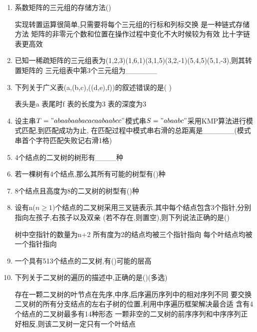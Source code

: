 \documentclass[12pt, a4paper, oneside, UTF8]{ctexbook}
\begin{document}
\begin{enumerate}
    \item 系数矩阵的三元组的存储方法()
    \begin{choices}[1]
        \task 实现转置运算很简单,只需要将每个三元组的行标和列标交换
        \task 是一种链式存储方法
        \task 矩阵的非零元个数和位置在操作过程中变化不大时候较为有效
        \task 比十字链表更高效
    \end{choices}

    \item 已知一稀疏矩阵的三元组表为(1,2,3)(1,6,1)(3,1,5)(3,2,-1)(5,4,5)(5,1,-3),则其转置矩阵的
    三元组表中第3个三元组为\_\_\_\_\_\_

    \item 下列关于广义表(a,(b,c),((d,e),f))的叙述错误的是(   ) 
    \begin{choices}
        \task 表头是a \task 表尾时f \task 表的长度为3 \task 表的深度为3
    \end{choices}

    \item 设主串$T="abaabaabacacaabaabcc"$模式串$S="abaabc"$采用KMP算法进行模式匹配,到匹配成功为止,
    在匹配过程中模式串右滑的总距离是\_\_\_\_\_\_(模式串首个字符匹配失败记右滑1格)

    \item 4个结点的二叉树的树形有\_\_\_\_种 
    \item 若一棵树有4个结点,那么其所有可能的树型有(\qquad)种
    \item 8个结点且高度为8的二叉树的树型有(\qquad)种
    \item 设有n($n\geq 1$)个结点的二叉树采用三叉链表示,其中每个结点包含3个指针,分别指向左孩子,右孩子以及双亲
    (若不存在,则置空),则下列说法正确的是(\qquad) 
    \begin{choices}[1]
        \task 树中空指针的数量为n+2
        \task 所有度为2的结点均被三个指针指向
        \task 每个叶结点均被一个指针指向
    \end{choices}

    \item 一个具有513个结点的二叉树,有(\qquad)可能的层高
    \item 下列关于二叉树的遍历的描述中,正确的是(\qquad)(多选)
    \begin{choices}[1]
        \task 存在一颗二叉树的叶节点在先序,中序,后序遍历序列中的相对序列不同
        \task 要交换二叉树的所有分支结点的左右子树的位置,利用中序遍历框架解决最合适
        \task 含有4个结点的二叉树最多有14种形态
        \task 一颗非空的二叉树的前序序列和中序序列正好相反,则该二叉树一定只有一个叶结点
    \end{choices}


\end{enumerate}
\end{document}

